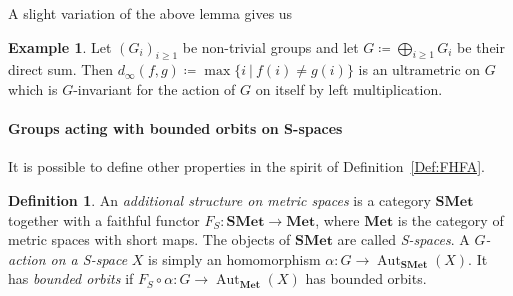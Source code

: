 \documentclass[a4paper]{article}
\theoremstyle{definition}
\newtheorem{defn}[lem]{Definition}
\newtheorem{exmp}[lem]{Example}
\DeclareMathOperator\Hom{Hom}
\DeclareMathOperator\Aut{Aut}
\newcommand{\setst}[2]{\{#1\ |\ #2\}}
\begin{document}
%
%
A slight variation of the above lemma gives us
\begin{exmp}\label{Exmpl:Ultra}
Let $(G_i)_{i\geq 1}$ be non-trivial groups and let $G\coloneqq\bigoplus_{i\geq 1} G_i$ be their direct sum.
Then $d_\infty(f,g)\coloneqq\max\setst{i}{f(i)\neq g(i)}$ is an ultrametric on $G$ which is $G$-invariant for the action of $G$ on itself by left multiplication.
\end{exmp}






\paragraph{Groups acting with bounded orbits on S-spaces}
It is possible to define other properties in the spirit of Definition~\ref{Def:FHFA}.
%
%
%
%
%
\begin{defn}\label{Def:Categoric}
An \emph{additional structure on metric spaces} is a category $\mathbf{SMet}$ together with a faithful functor $F_{S}\colon \mathbf{SMet}\to \mathbf{Met}$, where $\mathbf{Met}$ is the category of metric spaces with short maps.
The objects of $\mathbf{SMet}$ are called \emph{S-spaces}.
A \emph{$G$-action on a S-space} $X$ is simply an homomorphism $\alpha\colon G\to\Aut_{\mathbf{SMet}}(X)$. It has \emph{bounded orbits} if $F_S\circ \alpha\colon G\to \Aut_{\mathbf{Met}}(X)$ has bounded orbits.
\end{defn}
\end{document}
